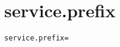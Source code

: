 \section{service.prefix}
\label{configuration:ServicePrefix}
\AvailableInCsharpOnly{\TODO}
\begin{lstlisting}[style=Props,caption={Usage example for \textit{service.prefix}}]
service.prefix=
\end{lstlisting}